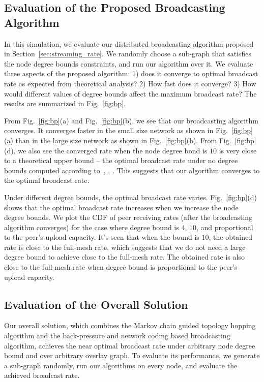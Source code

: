 \documentclass[10pt,conference]{IEEEtran}
\begin{document}
\subsection{Evaluation of the Proposed Broadcasting Algorithm }

In this simulation, we evaluate our distributed broadcasting algorithm
proposed in Section~\ref{sec:streaming_rate}. We randomly choose a sub-graph that satisfies the node degree bounds constraints, and run our algorithm over it. We evaluate three aspects of the proposed algorithm: 1) does it converge to optimal broadcast rate as expected from theoretical analysis? 2) How fast does it converge?
3) How would different values of degree bounds affect the maximum
broadcast rate? The results are summarized in Fig.~\ref{fig:bp}.

From Fig.~\ref{fig:bp}(a) and Fig.~\ref{fig:bp}(b), we see that our broadcasting algorithm converges. It converges faster in the small size network as shown in Fig.~\ref{fig:bp}(a) than in the large size network as shown in Fig.~\ref{fig:bp}(b). From  Fig.~\ref{fig:bp}(d), we also see the converged rate when the node degree bond is $10$ is very close to a theoretical upper bound -- the optimal broadcast rate under no degree bounds computed according to~\cite{all:Mutualcast:LPZ05}, \cite{chen2008ump}, \cite{all:P2PStreaming:KLR.07}. This suggests that our algorithm converges to the optimal broadcast rate.

Under different degree bounds, the optimal broadcast rate varies. Fig.~\ref{fig:bp}(d) shows that the optimal broadcast rate increases when we increase the node degree bounds. We plot the CDF of peer receiving rates (after the broadcasting algorithm converges) for the case where degree bound is $4$, $10$, and proportional to the peer's upload capacity. It's seen that when the bound is $10$, the obtained rate is close to the full-mesh rate, which suggests that we do not need a large degree bound to achieve close to the full-mesh rate. The obtained rate is also close to the full-mesh rate when degree bound is proportional to the peer's upload capacity.

\subsection{Evaluation of the Overall Solution}

Our overall solution, which combines the Markov chain guided topology hopping algorithm and
the back-pressure and network coding based broadcasting algorithm, achieves the near optimal broadcast rate
under arbitrary node degree bound and over arbitrary overlay graph.
To evaluate its performance, we generate a sub-graph randomly, run our algorithms on
every node, and evaluate the achieved broadcast rate.
\end{document}
